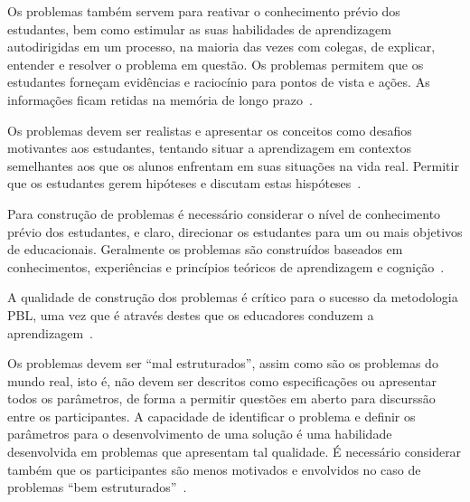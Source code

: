Os problemas também servem para reativar o conhecimento prévio dos
estudantes, bem como estimular as suas habilidades de aprendizagem
autodirigidas em um processo, na maioria das vezes com colegas,
de explicar, entender e resolver o problema em
questão.
Os problemas permitem que os estudantes forneçam evidências
e raciocínio para pontos de vista e ações.
As informações ficam retidas na memória de longo
prazo~\cite{des1999delphi, azer2012twelve}.

Os problemas devem ser realistas e apresentar os conceitos como
desafios motivantes aos estudantes, tentando situar a
aprendizagem em contextos semelhantes aos que os alunos
enfrentam em suas situações na vida real.
Permitir que os estudantes gerem hipóteses e discutam
estas hispóteses~\cite{albanese2010problem, azer2012twelve}.

Para construção de problemas é necessário considerar o nível de
conhecimento prévio dos estudantes, e claro, direcionar os estudantes
para um ou mais objetivos de educacionais.
Geralmente os problemas são construídos baseados em conhecimentos,
experiências e princípios teóricos de aprendizagem e
cognição~\cite{des1999delphi,dolmans1997seven}.

A qualidade de construção dos problemas é crítico para o
sucesso da metodologia PBL, uma vez que é através destes
que os educadores conduzem a
aprendizagem~\cite{santos2009analisa, des1999delphi}.

Os problemas devem ser ``mal estruturados'', assim como
são os problemas do mundo real, isto é, não
devem ser descritos como especificações ou apresentar
todos os parâmetros, de forma a
permitir questões em aberto para discurssão entre
os participantes.
A capacidade de identificar o problema e definir os
parâmetros para o desenvolvimento de uma solução é uma
habilidade desenvolvida em problemas que apresentam
tal qualidade.
É necessário considerar também que os participantes
são menos motivados e envolvidos no caso de problemas
``bem estruturados''~\cite{savery2015overview}.



